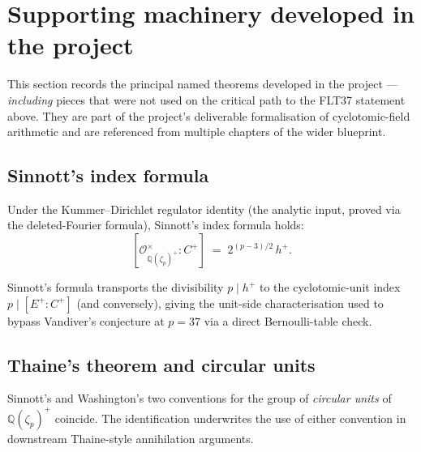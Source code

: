 \section{Supporting machinery developed in the project}

This section records the principal named theorems developed in the
project — \emph{including} pieces that were not used on the critical path
to the FLT37 statement above.  They are part of the project's
deliverable formalisation of cyclotomic-field arithmetic and are
referenced from multiple chapters of the wider blueprint.

\subsection*{Sinnott's index formula}

\begin{theorem}
  \label{thm:sinnottIndexFormula_of_regulatorIdentity}
  \leanok
  Under the Kummer--Dirichlet regulator identity (the analytic input,
  proved via the deleted-Fourier formula), Sinnott's index formula holds:
  \[
    [\mathcal O_{\mathbb Q(\zeta_p)^+}^\times : C^+]
      \;=\; 2^{(p-3)/2}\, h^+.
  \]
\end{theorem}

\begin{theorem}
  \label{thm:cyclotomicUnitIndex_primeConductor_pPrimary_of_sinnottIndexFormula}
  \leanok
  Sinnott's formula transports the divisibility $p \mid h^+$ to the
  cyclotomic-unit index $p \mid [E^+ : C^+]$ (and conversely), giving
  the unit-side characterisation used to bypass Vandiver's conjecture
  at $p = 37$ via a direct Bernoulli-table check.
\end{theorem}

\subsection*{Thaine's theorem and circular units}

\begin{theorem}
  \label{thm:circularSubgroupKplus_eq_sinnott_eq_washington}
  \leanok
  Sinnott's and Washington's two conventions for the group of
  \emph{circular units} of $\mathbb Q(\zeta_p)^+$ coincide.  The
  identification underwrites the use of either convention in
  downstream Thaine-style annihilation arguments.
\end{theorem}

